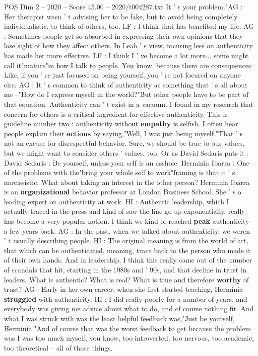 \begin{textsample}{POS Dim 2 – 2020 – Score 45.00 – 2020/t004287.txt}
It ' s your problem."AG : Her therapist wasn ' t advising her to be fake, but to avoid being completely individualistic, to think of others, too.
LF : I think that has benefited my life.
AG : Sometimes people get so absorbed in expressing their own opinions that they lose sight of how they affect others.
In Leah ' s view, focusing less on authenticity has made her more effective.
LF : I think I ' ve become a lot more... some might call it"mature"in how I talk to people.
You know, because there are consequences.
Like, if you ' re just focused on being yourself, you ' re not focused on anyone else.
AG : It ' s common to think of authenticity as something that ' s all about me --"How do I express myself in the world?"But other people have to be part of that equation.
Authenticity can ' t exist in a vacuum.
I found in my research that concern for others is a critical ingredient for effective authenticity.
This is guideline number two : authenticity without \textbf{empathy} is selfish.
I often hear people explain their \textbf{actions} by saying,"Well, I was just being myself."That ' s not an excuse for disrespectful behavior.
Sure, we should be true to our values, but we might want to consider others ' values, too.
Or as David Sedaris puts it : David Sedaris : Be yourself, unless your self is an asshole.
Herminia Ibarra : One of the problems with the"bring your whole self to work"framing is that it ' s narcissistic.
What about taking an interest in the other person?
Herminia Ibarra is an \textbf{organizational} behavior professor at London Business School.
She ' s a leading expert on authenticity at work.
HI : Authentic leadership, which I actually traced in the press and kind of saw the line go up exponentially, really has become a very popular notion.
I think we kind of reached \textbf{peak} authenticity a few years back.
AG : In the past, when we talked about authenticity, we weren ' t usually describing people.
HI : The original meaning is from the world of art, that which can be authenticated, meaning, trace back to the person who made it of their own hands.
And in leadership, I think this really came out of the number of scandals that hit, starting in the 1980s and ' 90s, and that decline in trust in leaders.
What is authentic?
What is real?
What is true and therefore \textbf{worthy} of trust?
AG : Early in her own career, when she first started teaching, Herminia \textbf{struggled} with authenticity.
HI : I did really poorly for a number of years, and everybody was giving me advice about what to do, and of course nothing fit.
And what I was struck with was the least helpful feedback was,"Just be yourself, Herminia."And of course that was the worst feedback to get because the problem was I was too much myself, you know, too introverted, too nervous, too academic, too theoretical -- all of those things.

\end{textsample}
